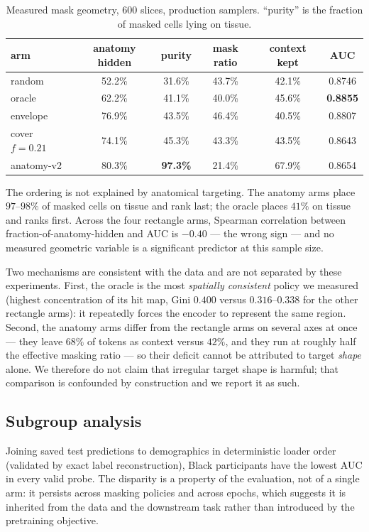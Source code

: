 \documentclass{article}
\begin{document}
\begin{table}[t]
\centering
\caption{Measured mask geometry, 600 slices, production samplers. ``purity'' is
the fraction of masked cells lying on tissue.}
\label{tab:geom}
\small
\begin{tabular}{lccccc}
\toprule
arm & anatomy hidden & purity & mask ratio & context kept & AUC \\
\midrule
random          & 52.2\% & 31.6\% & 43.7\% & 42.1\% & 0.8746 \\
oracle          & 62.2\% & 41.1\% & 40.0\% & 45.6\% & \textbf{0.8855} \\
envelope        & 76.9\% & 43.5\% & 46.4\% & 40.5\% & 0.8807 \\
cover $f{=}0.21$ & 74.1\% & 45.3\% & 43.3\% & 43.5\% & 0.8643 \\
anatomy-v2      & 80.3\% & \textbf{97.3\%} & 21.4\% & 67.9\% & 0.8654 \\
\bottomrule
\end{tabular}
\end{table}

The ordering is not explained by anatomical targeting. The anatomy arms place
$97$--$98\%$ of masked cells on tissue and rank last; the oracle places $41\%$
on tissue and ranks first. Across the four rectangle arms, Spearman correlation
between fraction-of-anatomy-hidden and AUC is $-0.40$ --- the wrong sign --- and
no measured geometric variable is a significant predictor at this sample size.

Two mechanisms are consistent with the data and are not separated by these
experiments. First, the oracle is the most \emph{spatially consistent} policy we
measured (highest concentration of its hit map, Gini $0.400$ versus $0.316$--$0.338$
for the other rectangle arms): it repeatedly forces the encoder to represent the
same region. Second, the anatomy arms differ from the rectangle arms on several
axes at once --- they leave $68\%$ of tokens as context versus $42\%$, and they
run at roughly half the effective masking ratio --- so their deficit cannot be
attributed to target \emph{shape} alone. We therefore do not claim that
irregular target shape is harmful; that comparison is confounded by
construction and we report it as such.

\subsection{Subgroup analysis}

Joining saved test predictions to demographics in deterministic loader order
(validated by exact label reconstruction), Black participants have the lowest
AUC in every valid probe. The disparity is a property of the evaluation, not of
a single arm: it persists across masking policies and across epochs, which
suggests it is inherited from the data and the downstream task rather than
introduced by the pretraining objective.
\end{document}
